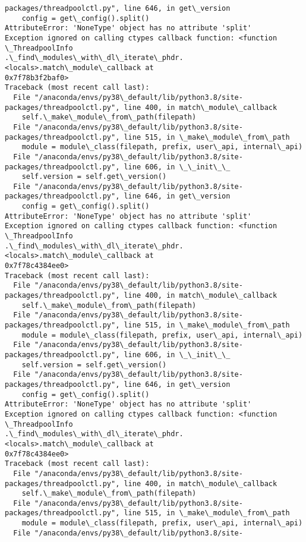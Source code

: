 \documentclass[11pt]{article}
\begin{document}
\begin{Verbatim}[commandchars=\\\{\}]
packages/threadpoolctl.py", line 646, in get\_version
    config = get\_config().split()
AttributeError: 'NoneType' object has no attribute 'split'
Exception ignored on calling ctypes callback function: <function \_ThreadpoolInfo
.\_find\_modules\_with\_dl\_iterate\_phdr.<locals>.match\_module\_callback at
0x7f78b3f2baf0>
Traceback (most recent call last):
  File "/anaconda/envs/py38\_default/lib/python3.8/site-
packages/threadpoolctl.py", line 400, in match\_module\_callback
    self.\_make\_module\_from\_path(filepath)
  File "/anaconda/envs/py38\_default/lib/python3.8/site-
packages/threadpoolctl.py", line 515, in \_make\_module\_from\_path
    module = module\_class(filepath, prefix, user\_api, internal\_api)
  File "/anaconda/envs/py38\_default/lib/python3.8/site-
packages/threadpoolctl.py", line 606, in \_\_init\_\_
    self.version = self.get\_version()
  File "/anaconda/envs/py38\_default/lib/python3.8/site-
packages/threadpoolctl.py", line 646, in get\_version
    config = get\_config().split()
AttributeError: 'NoneType' object has no attribute 'split'
Exception ignored on calling ctypes callback function: <function \_ThreadpoolInfo
.\_find\_modules\_with\_dl\_iterate\_phdr.<locals>.match\_module\_callback at
0x7f78c4384ee0>
Traceback (most recent call last):
  File "/anaconda/envs/py38\_default/lib/python3.8/site-
packages/threadpoolctl.py", line 400, in match\_module\_callback
    self.\_make\_module\_from\_path(filepath)
  File "/anaconda/envs/py38\_default/lib/python3.8/site-
packages/threadpoolctl.py", line 515, in \_make\_module\_from\_path
    module = module\_class(filepath, prefix, user\_api, internal\_api)
  File "/anaconda/envs/py38\_default/lib/python3.8/site-
packages/threadpoolctl.py", line 606, in \_\_init\_\_
    self.version = self.get\_version()
  File "/anaconda/envs/py38\_default/lib/python3.8/site-
packages/threadpoolctl.py", line 646, in get\_version
    config = get\_config().split()
AttributeError: 'NoneType' object has no attribute 'split'
Exception ignored on calling ctypes callback function: <function \_ThreadpoolInfo
.\_find\_modules\_with\_dl\_iterate\_phdr.<locals>.match\_module\_callback at
0x7f78c4384ee0>
Traceback (most recent call last):
  File "/anaconda/envs/py38\_default/lib/python3.8/site-
packages/threadpoolctl.py", line 400, in match\_module\_callback
    self.\_make\_module\_from\_path(filepath)
  File "/anaconda/envs/py38\_default/lib/python3.8/site-
packages/threadpoolctl.py", line 515, in \_make\_module\_from\_path
    module = module\_class(filepath, prefix, user\_api, internal\_api)
  File "/anaconda/envs/py38\_default/lib/python3.8/site-

\end{Verbatim}
\end{document}
